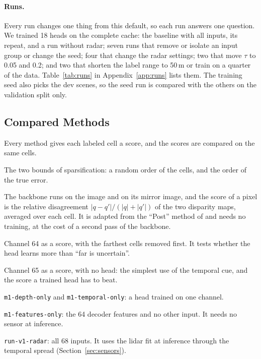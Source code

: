 \paragraph{Runs.} Every run changes one thing from this default, so each run answers one question. We trained 18 heads on the complete cache: the baseline with all inputs, its repeat, and a run without radar; seven runs that remove or isolate an input group or change the seed; four that change the radar settings; two that move $\tau$ to 0.05 and 0.2; and two that shorten the label range to 50\,m or train on a quarter of the data. Table~\ref{tab:runs} in Appendix~\ref{app:runs} lists them. The training seed also picks the dev scenes, so the seed run is compared with the others on the validation split only. 

\subsection{Compared Methods}
\label{sec:methods}

Every method gives each labeled cell a score, and the scores are compared on the same cells.

\begin{description}[leftmargin=1em, itemsep=1pt, topsep=2pt]
  \item[Random and oracle.] The two bounds of sparsification: a random order of the cells, and the order of the true error.
  \item[Flip disagreement.] The backbone runs on the image and on its mirror image, and the score of a pixel is the relative disagreement $|q - q'| / (|q| + |q'|)$ of the two disparity maps, averaged over each cell. It is adapted from the ``Post'' method of \citet{poggi2020uncertainty} and needs no training, at the cost of a second pass of the backbone.
  \item[Normalized disparity.] Channel 64 as a score, with the farthest cells removed first. It tests whether the head learns more than ``far is uncertain''. 
  \item[Temporal spread.] Channel 65 as a score, with no head: the simplest use of the temporal cue, and the score a trained head has to beat. 
  \item[Single-cue heads.] \texttt{m1-depth-only} and \texttt{m1-temporal-only}: a head trained on one channel.
  \item[Features-only head.] \texttt{m1-features-only}: the 64 decoder features and no other input. It needs no sensor at inference.
  \item[Full head.] \texttt{run-v1-radar}: all 68 inputs. It uses the lidar fit at inference through the temporal spread (Section~\ref{sec:sensors}).
\end{description}

